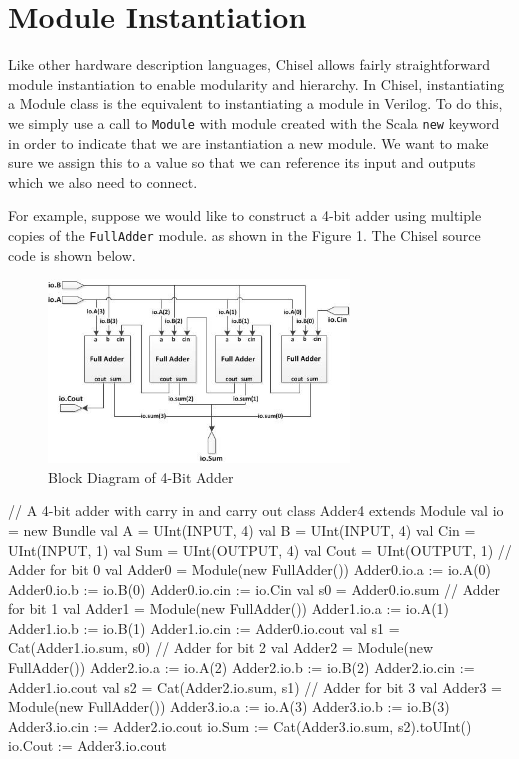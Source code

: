\section{Module Instantiation}

Like other hardware description languages, Chisel allows fairly straightforward module instantiation to enable modularity and hierarchy. In Chisel, instantiating a Module class is the equivalent to instantiating a module in Verilog. To do this, we simply use a call to \verb+Module+ with module created with the Scala \verb+new+ keyword in order to indicate that we are instantiation a new module. We want to make sure we assign this to a value so that we can reference its input and outputs which we also need to connect.

For example, suppose we would like to construct a 4-bit adder using multiple copies of the  \verb+FullAdder+ module. as shown in the Figure 1. The Chisel source code is shown below.

\begin{figure}[ht!]
\centering
\includegraphics[width=80mm]{figs/4_Bit_Adder.jpg}
\caption{Block Diagram of 4-Bit Adder}
\label{overflow}
\end{figure}

\begin{scala}
// A 4-bit adder with carry in and carry out
class Adder4 extends Module {
  val io = new Bundle {
    val A    = UInt(INPUT, 4)
    val B    = UInt(INPUT, 4)
    val Cin  = UInt(INPUT, 1)
    val Sum  = UInt(OUTPUT, 4)
    val Cout = UInt(OUTPUT, 1)
  }
  // Adder for bit 0
  val Adder0 = Module(new FullAdder())
  Adder0.io.a   := io.A(0)
  Adder0.io.b   := io.B(0)
  Adder0.io.cin := io.Cin
  val s0 = Adder0.io.sum
  // Adder for bit 1
  val Adder1 = Module(new FullAdder())
  Adder1.io.a   := io.A(1)
  Adder1.io.b   := io.B(1)
  Adder1.io.cin := Adder0.io.cout
  val s1 = Cat(Adder1.io.sum, s0)
  // Adder for bit 2
  val Adder2 = Module(new FullAdder())
  Adder2.io.a   := io.A(2)
  Adder2.io.b   := io.B(2)
  Adder2.io.cin := Adder1.io.cout
  val s2 = Cat(Adder2.io.sum, s1)
  // Adder for bit 3
  val Adder3 = Module(new FullAdder())
  Adder3.io.a   := io.A(3)
  Adder3.io.b   := io.B(3)
  Adder3.io.cin := Adder2.io.cout
  io.Sum  := Cat(Adder3.io.sum, s2).toUInt()
  io.Cout := Adder3.io.cout
}
\end{scala}

